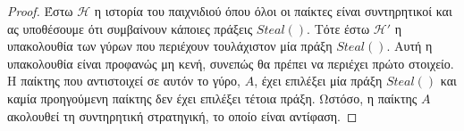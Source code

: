 \begin{proof}
  Έστω $\mathcal{H}$ η ιστορία του παιχνιδιού όπου όλοι οι παίκτες είναι συντηρητικοί και ας υποθέσουμε ότι συμβαίνουν κάποιες
  πράξεις $Steal\left(\right)$. Τότε έστω $\mathcal{H}'$ η υπακολουθία των γύρων που περιέχουν τουλάχιστον μία πράξη
  $Steal\left(\right)$. Αυτή η υπακολουθία είναι προφανώς μη κενή, συνεπώς θα πρέπει να περιέχει πρώτο στοιχείο. Η παίκτης που
  αντιστοιχεί σε αυτόν το γύρο, $A$, έχει επιλέξει μία πράξη $Steal\left(\right)$ και καμία προηγούμενη παίκτης δεν έχει
  επιλέξει τέτοια πράξη. Ωστόσο, η παίκτης $A$ ακολουθεί τη συντηρητική στρατηγική, το οποίο είναι αντίφαση.
\end{proof}
